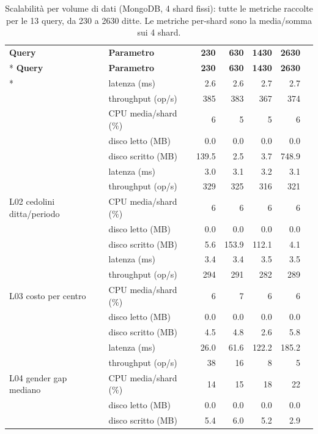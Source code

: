 \begingroup
\footnotesize
\begin{longtable}{@{}llrrrrr@{}}
\caption{Scalabilità per volume di dati (MongoDB, 4 shard fissi): tutte le metriche raccolte per le 13 query, da 230 a 2630 ditte. Le metriche per-shard sono la media/somma sui 4 shard.}\label{tab:scaling-dati-mongo-full}\\
\toprule \textbf{Query} & \textbf{Parametro} & \textbf{230} & \textbf{630} & \textbf{1430} & \textbf{2630} \\* \midrule \endfirsthead
\toprule \textbf{Query} & \textbf{Parametro} & \textbf{230} & \textbf{630} & \textbf{1430} & \textbf{2630} \\* \midrule \endhead
\multirow{5}{*}{L01 cedolino singolo} & latenza (ms)      & 2.6 & 2.6 & 2.7 & 2.7 \\
 & throughput (op/s)  & 385 & 383 & 367 & 374 \\
 & CPU media/shard (\%) & 6 & 5 & 5 & 6 \\
 & disco letto (MB)   & 0.0 & 0.0 & 0.0 & 0.0 \\
 & disco scritto (MB) & 139.5 & 2.5 & 3.7 & 748.9 \\ \midrule
\multirow{5}{*}{L02 cedolini ditta/periodo} & latenza (ms)      & 3.0 & 3.1 & 3.2 & 3.1 \\
 & throughput (op/s)  & 329 & 325 & 316 & 321 \\
 & CPU media/shard (\%) & 6 & 6 & 6 & 6 \\
 & disco letto (MB)   & 0.0 & 0.0 & 0.0 & 0.0 \\
 & disco scritto (MB) & 5.6 & 153.9 & 112.1 & 4.1 \\ \midrule
\multirow{5}{*}{L03 costo per centro} & latenza (ms)      & 3.4 & 3.4 & 3.5 & 3.5 \\
 & throughput (op/s)  & 294 & 291 & 282 & 289 \\
 & CPU media/shard (\%) & 6 & 7 & 6 & 6 \\
 & disco letto (MB)   & 0.0 & 0.0 & 0.0 & 0.0 \\
 & disco scritto (MB) & 4.5 & 4.8 & 2.6 & 5.8 \\ \midrule
\multirow{5}{*}{L04 gender gap mediano} & latenza (ms)      & 26.0 & 61.6 & 122.2 & 185.2 \\
 & throughput (op/s)  & 38 & 16 & 8 & 5 \\
 & CPU media/shard (\%) & 14 & 15 & 18 & 22 \\
 & disco letto (MB)   & 0.0 & 0.0 & 0.0 & 0.0 \\
 & disco scritto (MB) & 5.4 & 6.0 & 5.2 & 2.9 \\ \midrule

\end{longtable}
